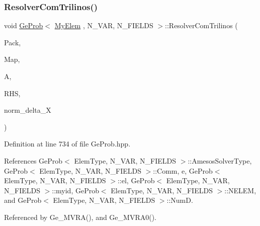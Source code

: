 \subsubsection{\texorpdfstring{Resolver\+Com\+Trilinos()}{ResolverComTrilinos()}}
{\footnotesize\ttfamily void \hyperlink{classGeProb}{Ge\+Prob}$<$ \hyperlink{DG__Prob_8h_a83cd887ced9a6587428f267e50cd4787}{My\+Elem} , N\+\_\+\+V\+AR, N\+\_\+\+F\+I\+E\+L\+DS $>$\+::Resolver\+Com\+Trilinos (\begin{DoxyParamCaption}\item[{const std\+::string}]{Pack,  }\item[{Epetra\+\_\+\+Map}]{Map,  }\item[{Teuchos\+::\+R\+CP$<$ Epetra\+\_\+\+F\+E\+Crs\+Matrix $>$}]{A,  }\item[{Teuchos\+::\+R\+CP$<$ Epetra\+\_\+\+F\+E\+Vector $>$}]{R\+HS,  }\item[{double\+\_\+t \&}]{norm\+\_\+delta\+\_\+X }\end{DoxyParamCaption})\hspace{0.3cm}{\ttfamily [inherited]}}



Definition at line 734 of file Ge\+Prob.\+hpp.



References Ge\+Prob$<$ Elem\+Type, N\+\_\+\+V\+A\+R, N\+\_\+\+F\+I\+E\+L\+D\+S $>$\+::\+Amesos\+Solver\+Type, Ge\+Prob$<$ Elem\+Type, N\+\_\+\+V\+A\+R, N\+\_\+\+F\+I\+E\+L\+D\+S $>$\+::\+Comm, e, Ge\+Prob$<$ Elem\+Type, N\+\_\+\+V\+A\+R, N\+\_\+\+F\+I\+E\+L\+D\+S $>$\+::el, Ge\+Prob$<$ Elem\+Type, N\+\_\+\+V\+A\+R, N\+\_\+\+F\+I\+E\+L\+D\+S $>$\+::myid, Ge\+Prob$<$ Elem\+Type, N\+\_\+\+V\+A\+R, N\+\_\+\+F\+I\+E\+L\+D\+S $>$\+::\+N\+E\+L\+EM, and Ge\+Prob$<$ Elem\+Type, N\+\_\+\+V\+A\+R, N\+\_\+\+F\+I\+E\+L\+D\+S $>$\+::\+NumD.



Referenced by Ge\+\_\+\+M\+V\+R\+A(), and Ge\+\_\+\+M\+V\+R\+A0().

\mbox{\label{classGeProb_adc17f3e57dab093882ec7f7aebea634f}} 

